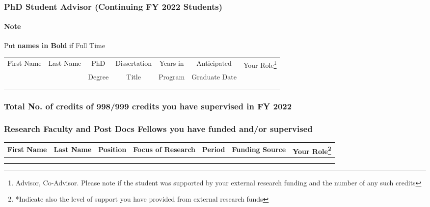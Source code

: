 \documentclass[11pt]{article}
\newcommand{\fy}{2022}
\begin{document}
\subsubsection{PhD Student Advisor (Continuing FY \fy{} Students)}

\paragraph{Note} Put \textbf{names in Bold} if Full Time

\vspace{0.1in}

\begin{minipage}{\textwidth}
  \footnotesize
  \centering
  \begin{tabular}{ccccccc}
    \toprule
    First Name& Last Name& PhD & Dissertation& Years in& Anticipated& Your Role\footnote{Advisor, Co-Advisor. Please note if the student was supported by your external research funding and the number of any such credits}\\
    &&Degree& Title& Program& Graduate Date& \\
    \midrule
              &&&&\\
              &&&&
  \end{tabular}
\end{minipage}

\subsubsection{Total No. of credits of 998/999 credits you have supervised in FY \fy{}}

\subsubsection{Research Faculty and Post Docs Fellows you have funded and/or supervised}

\begin{minipage}{\textwidth}
  \footnotesize
  \centering
  \begin{tabular}{ccccccc}
    \toprule
    First Name& Last Name& Position& Focus of Research& Period& Funding Source &Your Role\footnote{*Indicate also the level of support you have provided from external research funds}\\
    \midrule
              &&&&&&\\
              &&&&&&
  \end{tabular}
\end{minipage}
\end{document}
